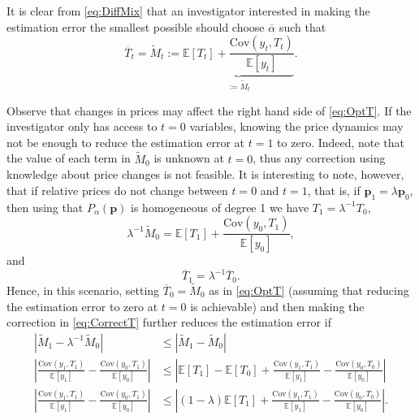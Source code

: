 \documentclass[english, a4paper, 12pt]{article}
\begin{document}
It is clear from \eqref{eq:DiffMix} that an investigator interested in making the estimation error the smallest possible should choose $\overline{\alpha}$ such that
	\begin{equation} \label{eq:OptT}
		\overline{T}_{t} = \tilde{M}_{t} := \underbrace{\mathbb{E}\left[T_{t} \right] + \frac{\mathrm{Cov}\left(y_{t}, T_{t} \right)}{\mathbb{E}[y_{t}]}}_{:= \tilde{M}_{t}}.
	\end{equation}

Observe that changes in prices may affect the right hand side of \eqref{eq:OptT}. If the investigator only has access to $t =0$ variables, knowing the price dynamics may not be enough to reduce the estimation error at $t =1$ to zero. Indeed, note that the value of each term in $\tilde{M}_{0}$ is unknown at $t=0$, thus any correction using knowledge about price changes is not feasible. It is interesting to note, however, that if relative prices do not change between $t=0$ and $t=1$, that is, if $\mathbf{p}_{1} = \lambda \mathbf{p}_{0}$, then using that $P_{\alpha}(\mathbf{p})$ is homogeneous of degree 1 we have $T_{1} = \lambda^{-1}T_{0}$,
	$$\lambda^{-1}\tilde{M}_{0} = \mathbb{E}[T_{1}] + \frac{\mathrm{Cov}\left(y_{0}, T_{1} \right)}{\mathbb{E}[y_{0}]},$$
and
	\begin{equation} \label{eq:CorrectT}
		\overline{T}_{1} = \lambda^{-1}\overline{T}_{0}.
	\end{equation}
Hence, in this scenario, setting $\overline{T}_{0} = \tilde{M}_{0}$ as in \eqref{eq:OptT} (assuming that reducing the estimation error to zero at $t=0$ is achievable) and then making the correction in \eqref{eq:CorrectT} further reduces the estimation error if
	\begin{align*}
		\left|\tilde{M}_{1} - \lambda^{-1}\tilde{M}_{0} \right|
			&\leq \left|\tilde{M}_{1} - \tilde{M}_{0} \right|	\\
		\left| \frac{\mathrm{Cov}\left(y_{1}, T_{1} \right)}{\mathbb{E}[y_{1}]} - \frac{\mathrm{Cov}\left(y_{0}, T_{1} \right)}{\mathbb{E}[y_{0}]} \right|
			&\leq \left| \mathbb{E}\left[T_{1} \right] - \mathbb{E}\left[T_{0} \right] + \frac{\mathrm{Cov}\left(y_{1}, T_{1} \right)}{\mathbb{E}[y_{1}]} - \frac{\mathrm{Cov}\left(y_{0}, T_{0} \right)}{\mathbb{E}[y_{0}]} \right|	\\
		\left| \frac{\mathrm{Cov}\left(y_{1}, T_{1} \right)}{\mathbb{E}[y_{1}]} - \frac{\mathrm{Cov}\left(y_{0}, T_{1} \right)}{\mathbb{E}[y_{0}]} \right|
			&\leq \left| (1-\lambda)\mathbb{E}\left[T_{1} \right] + \frac{\mathrm{Cov}\left(y_{1}, T_{1} \right)}{\mathbb{E}[y_{1}]} - \frac{\mathrm{Cov}\left(y_{0}, T_{0} \right)}{\mathbb{E}[y_{0}]} \right|.
	\end{align*}
\end{document}
